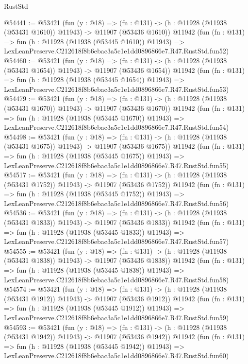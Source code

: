\begin{lexlean}{RustStd}
\begin{coremodule}
@54441 := @53421
    (fun (y : @18) =>
    (fn : @131) -> (h : @11928 (@11938 (@53431 @1610)) @11943) -> @11907 (@53436 @1610))
    @11942
    (fun (fn : @131) =>
    fun (h : @11928 (@11938 (@53445 @1610)) @11943) =>
    LexLeanPreserve.C212618f8b6ebac3a5c1e1dd0896866e7.R47.RustStd.fun52)
@54460 := @53421
    (fun (y : @18) =>
    (fn : @131) -> (h : @11928 (@11938 (@53431 @1654)) @11943) -> @11907 (@53436 @1654))
    @11942
    (fun (fn : @131) =>
    fun (h : @11928 (@11938 (@53445 @1654)) @11943) =>
    LexLeanPreserve.C212618f8b6ebac3a5c1e1dd0896866e7.R47.RustStd.fun53)
@54479 := @53421
    (fun (y : @18) =>
    (fn : @131) -> (h : @11928 (@11938 (@53431 @1670)) @11943) -> @11907 (@53436 @1670))
    @11942
    (fun (fn : @131) =>
    fun (h : @11928 (@11938 (@53445 @1670)) @11943) =>
    LexLeanPreserve.C212618f8b6ebac3a5c1e1dd0896866e7.R47.RustStd.fun54)
@54498 := @53421
    (fun (y : @18) =>
    (fn : @131) -> (h : @11928 (@11938 (@53431 @1675)) @11943) -> @11907 (@53436 @1675))
    @11942
    (fun (fn : @131) =>
    fun (h : @11928 (@11938 (@53445 @1675)) @11943) =>
    LexLeanPreserve.C212618f8b6ebac3a5c1e1dd0896866e7.R47.RustStd.fun55)
@54517 := @53421
    (fun (y : @18) =>
    (fn : @131) -> (h : @11928 (@11938 (@53431 @1752)) @11943) -> @11907 (@53436 @1752))
    @11942
    (fun (fn : @131) =>
    fun (h : @11928 (@11938 (@53445 @1752)) @11943) =>
    LexLeanPreserve.C212618f8b6ebac3a5c1e1dd0896866e7.R47.RustStd.fun56)
@54536 := @53421
    (fun (y : @18) =>
    (fn : @131) -> (h : @11928 (@11938 (@53431 @1833)) @11943) -> @11907 (@53436 @1833))
    @11942
    (fun (fn : @131) =>
    fun (h : @11928 (@11938 (@53445 @1833)) @11943) =>
    LexLeanPreserve.C212618f8b6ebac3a5c1e1dd0896866e7.R47.RustStd.fun57)
@54555 := @53421
    (fun (y : @18) =>
    (fn : @131) -> (h : @11928 (@11938 (@53431 @1838)) @11943) -> @11907 (@53436 @1838))
    @11942
    (fun (fn : @131) =>
    fun (h : @11928 (@11938 (@53445 @1838)) @11943) =>
    LexLeanPreserve.C212618f8b6ebac3a5c1e1dd0896866e7.R47.RustStd.fun58)
@54574 := @53421
    (fun (y : @18) =>
    (fn : @131) -> (h : @11928 (@11938 (@53431 @1912)) @11943) -> @11907 (@53436 @1912))
    @11942
    (fun (fn : @131) =>
    fun (h : @11928 (@11938 (@53445 @1912)) @11943) =>
    LexLeanPreserve.C212618f8b6ebac3a5c1e1dd0896866e7.R47.RustStd.fun59)
@54593 := @53421
    (fun (y : @18) =>
    (fn : @131) -> (h : @11928 (@11938 (@53431 @1942)) @11943) -> @11907 (@53436 @1942))
    @11942
    (fun (fn : @131) =>
    fun (h : @11928 (@11938 (@53445 @1942)) @11943) =>
    LexLeanPreserve.C212618f8b6ebac3a5c1e1dd0896866e7.R47.RustStd.fun60)

\end{coremodule}
\end{lexlean}
